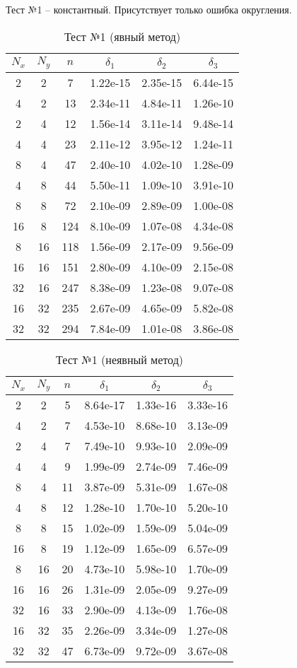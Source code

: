 \newpage
Тест №1 -- константный. Присутствует только ошибка округления.
\begin{table}[H]
	\centering
	\begin{tabular}{*6c}
		\toprule
		$N_x$ & $N_y$ & $n$ & $\delta_1$ & $\delta_2$ & $\delta_3$ \\
		\midrule
		2 & 2 & 7 & 1.22e-15 & 2.35e-15 & 6.44e-15 \\
		4 & 2 & 13 & 2.34e-11 & 4.84e-11 & 1.26e-10 \\
		2 & 4 & 12 & 1.56e-14 & 3.11e-14 & 9.48e-14 \\
		4 & 4 & 23 & 2.11e-12 & 3.95e-12 & 1.24e-11 \\
		8 & 4 & 47 & 2.40e-10 & 4.02e-10 & 1.28e-09 \\
		4 & 8 & 44 & 5.50e-11 & 1.09e-10 & 3.91e-10 \\
		8 & 8 & 72 & 2.10e-09 & 2.89e-09 & 1.00e-08 \\
		16 & 8 & 124 & 8.10e-09 & 1.07e-08 & 4.34e-08 \\
		8 & 16 & 118 & 1.56e-09 & 2.17e-09 & 9.56e-09 \\
		16 & 16 & 151 & 2.80e-09 & 4.10e-09 & 2.15e-08 \\
		32 & 16 & 247 & 8.38e-09 & 1.23e-08 & 9.07e-08 \\
		16 & 32 & 235 & 2.67e-09 & 4.65e-09 & 5.82e-08 \\
		32 & 32 & 294 & 7.84e-09 & 1.01e-08 & 3.86e-08 \\
		\bottomrule
	\end{tabular}
	\caption{Тест №1 (явный метод)}
\end{table}
\begin{table}[H]
	\centering
	\begin{tabular}{*6c}
		\toprule
		$N_x$ & $N_y$ & $n$ & $\delta_1$ & $\delta_2$ & $\delta_3$ \\
		\midrule
		2 & 2 & 5 & 8.64e-17 & 1.33e-16 & 3.33e-16 \\
		4 & 2 & 7 & 4.53e-10 & 8.68e-10 & 3.13e-09 \\
		2 & 4 & 7 & 7.49e-10 & 9.93e-10 & 2.09e-09 \\
		4 & 4 & 9 & 1.99e-09 & 2.74e-09 & 7.46e-09 \\
		8 & 4 & 11 & 3.87e-09 & 5.31e-09 & 1.67e-08 \\
		4 & 8 & 12 & 1.28e-10 & 1.70e-10 & 5.20e-10 \\
		8 & 8 & 15 & 1.02e-09 & 1.59e-09 & 5.04e-09 \\
		16 & 8 & 19 & 1.12e-09 & 1.65e-09 & 6.57e-09 \\
		8 & 16 & 20 & 4.73e-10 & 5.98e-10 & 1.70e-09 \\
		16 & 16 & 26 & 1.31e-09 & 2.05e-09 & 9.27e-09 \\
		32 & 16 & 33 & 2.90e-09 & 4.13e-09 & 1.76e-08 \\
		16 & 32 & 35 & 2.26e-09 & 3.34e-09 & 1.27e-08 \\
		32 & 32 & 47 & 6.73e-09 & 9.72e-09 & 3.67e-08 \\
		\bottomrule
	\end{tabular}
	\caption{Тест №1 (неявный метод)}
\end{table}

